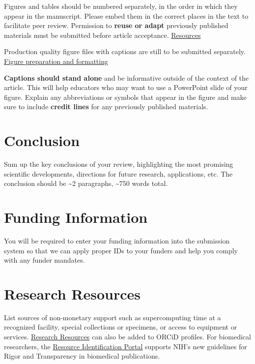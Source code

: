 \documentclass[10pt]{article}
\begin{document}
Figures and tables should be numbered separately, in the order in which
they appear in the manuscript. Please embed them in the correct places
in the text to facilitate peer review. Permission to \textbf{reuse or
adapt} previously published materials must be submitted before article
acceptance.
\href{http://wires.wiley.com/go/forauthors\#Resources}{Resources}

Production quality figure files with captions are still to be submitted
separately.
\href{https://authorservices.wiley.com/asset/photos/electronic_artwork_guidelines.pdf}{Figure
preparation and formatting}

\textbf{Captions should stand alone} and be informative outside of the
context of the article. This will help educators who may want to use a
PowerPoint slide of your figure. Explain any abbreviations or symbols
that appear in the figure and make sure to include \textbf{credit lines}
for any previously published materials.

\section*{Conclusion}

{\label{880788}}

Sum up the key conclusions of your review, highlighting the most
promising scientific developments, directions for future research,
applications, etc. The conclusion should be \textasciitilde{}2
paragraphs, \textasciitilde{}750 words total.

\section*{Funding Information}

{\label{974317}}

You will be required to enter your funding information into the
submission system so that we can apply proper IDs to your funders and
help you comply with any funder mandates.

\section*{Research Resources}

{\label{808103}}

List sources of non-monetary support such as supercomputing time at a
recognized facility, special collections or specimens, or access to
equipment or services.
\href{https://orcid.org/organizations/research-orgs/resources}{Research
Resources} can also be added to ORCiD profiles. For biomedical
researchers, the \href{https://scicrunch.org/resources}{Resource
Identification Portal} supports NIH's new guidelines for Rigor and
Transparency in biomedical publications.
\end{document}
